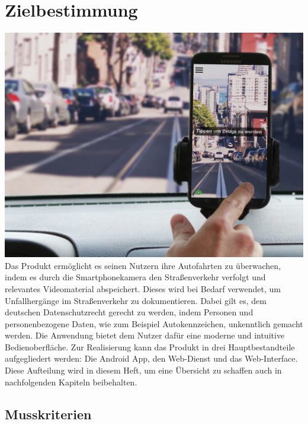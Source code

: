 \chapter{Zielbestimmung}

\includegraphics[width=\textwidth]{subtopicsFuncspec/Res//Mockups/Portrait_camera_view_car.jpg}\\[0.5cm]

Das Produkt ermöglicht es seinen Nutzern ihre Autofahrten zu überwachen, indem es durch die \gls{Smartphone}kamera den Straßenverkehr verfolgt und relevantes Videomaterial  abspeichert. Dieses wird bei Bedarf verwendet, um Unfallhergänge im Straßenverkehr zu dokumentieren. Dabei gilt es, dem deutschen Datenschutzrecht gerecht zu werden, indem Personen und personenbezogene Daten, wie zum Beispiel Autokennzeichen, unkenntlich gemacht werden. Die Anwendung bietet dem Nutzer dafür eine moderne und intuitive Bedienoberfläche.\newline
Zur Realisierung kann das Produkt in drei Hauptbestandteile aufgegliedert werden: Die \gls{Android} \gls{App}, den \gls{Web-Dienst} und das \gls{Web-Interface}. Diese Aufteilung wird in diesem Heft, um eine Übersicht zu schaffen auch in nachfolgenden Kapiteln beibehalten.

\section{Musskriterien}
